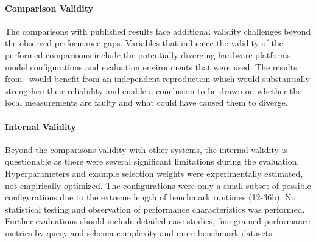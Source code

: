 \paragraph{Comparison Validity}

The comparisons with published results face additional validity challenges
beyond the observed performance gaps. Variables that influence the validity of
the performed comparisons include the potentially diverging hardware platforms,
model configurations and evaluation environments that were used. The results
from \OmniSQL~would benefit from an independent reproduction which would
substantially strengthen their reliability and enable a conclusion to be drawn
on whether the local measurements are faulty and what could have caused them to
diverge.

\paragraph{Internal Validity}

Beyond the comparisons validity with other systems, the internal validity is
questionable as there were several significant limitations during the
evaluation. Hyperparameters and example selection weights were experimentally
estimated, not empirically optimized. The configurations were only a small
subset of possible configurations due to the extreme length of benchmark
runtimes (12-36h). No statistical testing and observation of performance
characteristics was performed. Further evaluations should include detailed case
studies, fine-grained performance metrics by query and schema complexity and
more benchmark datasets.

